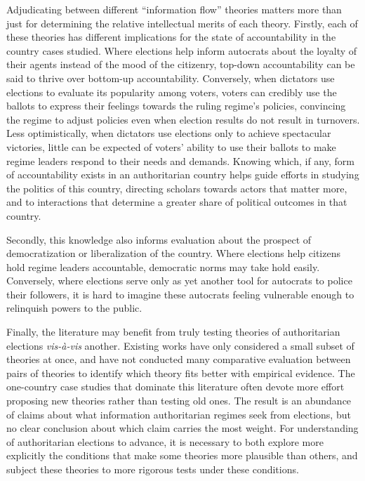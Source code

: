 \documentclass[12pt]{article}\usepackage[]{graphicx}\usepackage[]{color}
\newcommand{\1}{\mathbbm{1}}
\begin{document}
Adjudicating between different ``information flow'' theories matters more than just for determining the relative intellectual merits of each theory. Firstly, each of these theories has different implications for the state of accountability in the country cases studied. Where elections help inform autocrats about the loyalty of their agents instead of the mood of the citizenry, top-down accountability can be said to thrive over bottom-up accountability. Conversely, when dictators use elections to evaluate its popularity among voters, voters can credibly use the ballots to express their feelings towards the ruling regime's policies, convincing the regime to adjust policies even when election results do not result in turnovers. Less optimistically, when dictators use elections only to achieve spectacular victories, little can be expected of voters' ability to use their ballots to make regime leaders respond to their needs and demands. Knowing which, if any, form of accountability exists in an authoritarian country helps guide efforts in studying the politics of this country, directing scholars towards actors that matter more, and to interactions that determine a greater share of political outcomes in that country. 

Secondly, this knowledge also informs evaluation about the prospect of democratization or liberalization of the country. Where elections help citizens hold regime leaders accountable, democratic norms may take hold easily. Conversely, where elections serve only as yet another tool for autocrats to police their followers, it is hard to imagine these autocrats feeling vulnerable enough to relinquish powers to the public. 

Finally, the literature may benefit from truly testing theories of authoritarian elections \textit{vis-\`{a}-vis} another. Existing works have only considered a small subset of theories at once, and have not conducted many comparative evaluation between pairs of theories to identify which theory fits better with empirical evidence. The one-country case studies that dominate this literature \citep{LustOkar2005, Geddes2005, Magaloni2006, Blaydes2008} often devote more effort proposing new theories rather than testing old ones. The result is an abundance of claims about what information authoritarian regimes seek from elections, but no clear conclusion about which claim carries the most weight. For understanding of authoritarian elections to advance, it is necessary to both explore more explicitly the conditions that make some theories more plausible than others, and subject these theories to more rigorous tests under these conditions.
 
\end{document}
